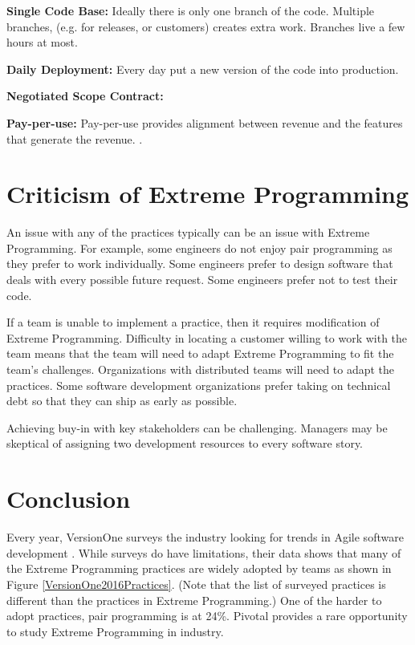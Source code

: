 \textbf{Single Code Base:} Ideally there is only one branch of the code. Multiple branches, (e.g. for releases, or customers) creates extra work. Branches live a few hours at most.

\textbf{Daily Deployment:} Every day put a new version of the code into production. 

\textbf{Negotiated Scope Contract:}  


\textbf{Pay-per-use:} Pay-per-use provides alignment between revenue and the features that generate the revenue.   \cite{BeckExtremeProgramming2004}.

\section{Criticism of Extreme Programming}
An issue with any of the practices typically can be an issue with Extreme Programming. For example, some engineers do not enjoy pair programming as they prefer to work individually. Some engineers prefer to design software that deals with every possible future request. Some engineers prefer not to test their code.

If a team is unable to implement a practice, then it requires modification of Extreme Programming.  Difficulty in locating a customer willing to work with the team means that the team will need to adapt Extreme Programming to fit the team's challenges.  Organizations with distributed teams will need to adapt the practices. Some software development organizations prefer taking on technical debt so that they can ship as early as possible. 

Achieving buy-in with key stakeholders can be challenging. Managers may be skeptical of assigning two development resources to every software story. 


\section{Conclusion}

Every year, VersionOne surveys the industry looking for trends in Agile software development \cite{VersionOne2016Report}. While surveys do have limitations, their data shows that many of the Extreme Programming practices are widely adopted by teams as shown in Figure \ref{VersionOne2016Practices}. (Note that the list of surveyed practices is different than the practices in Extreme Programming.) One of the harder to adopt practices, pair programming is at 24\%. Pivotal provides a rare opportunity to study Extreme Programming in industry.


